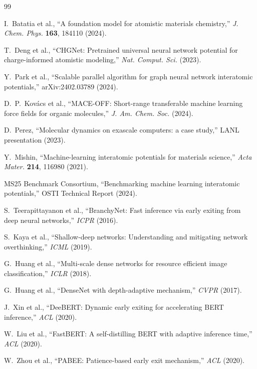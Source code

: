 \documentclass[11pt,a4paper]{article}
\begin{document}
\begin{thebibliography}{99}

I.~Batatia et al., ``A foundation model for atomistic materials chemistry,'' \textit{J. Chem. Phys.} \textbf{163}, 184110 (2024).

T.~Deng et al., ``CHGNet: Pretrained universal neural network potential for charge-informed atomistic modeling,'' \textit{Nat. Comput. Sci.} (2023).

Y.~Park et al., ``Scalable parallel algorithm for graph neural network interatomic potentials,'' arXiv:2402.03789 (2024).

D.~P.~Kovács et al., ``MACE-OFF: Short-range transferable machine learning force fields for organic molecules,'' \textit{J. Am. Chem. Soc.} (2024).

D.~Perez, ``Molecular dynamics on exascale computers: a case study,'' LANL presentation (2023).

Y.~Mishin, ``Machine-learning interatomic potentials for materials science,'' \textit{Acta Mater.} \textbf{214}, 116980 (2021).

MS25 Benchmark Consortium, ``Benchmarking machine learning interatomic potentials,'' OSTI Technical Report (2024).

S.~Teerapittayanon et al., ``BranchyNet: Fast inference via early exiting from deep neural networks,'' \textit{ICPR} (2016).

S.~Kaya et al., ``Shallow-deep networks: Understanding and mitigating network overthinking,'' \textit{ICML} (2019).

G.~Huang et al., ``Multi-scale dense networks for resource efficient image classification,'' \textit{ICLR} (2018).

G.~Huang et al., ``DenseNet with depth-adaptive mechanism,'' \textit{CVPR} (2017).

J.~Xin et al., ``DeeBERT: Dynamic early exiting for accelerating BERT inference,'' \textit{ACL} (2020).

W.~Liu et al., ``FastBERT: A self-distilling BERT with adaptive inference time,'' \textit{ACL} (2020).

W.~Zhou et al., ``PABEE: Patience-based early exit mechanism,'' \textit{ACL} (2020).


\end{thebibliography}
\end{document}
